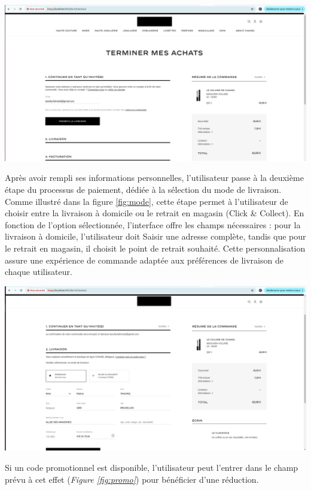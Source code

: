 \begin{center}
    \centering
    \includegraphics[width=19cm]{Figures/Screens/ajout de l'email.png}
    \label{fig:saisie}
\end{center}
Après avoir rempli ses informations personnelles, l'utilisateur passe à la deuxième étape du processus de paiement, dédiée à la sélection du mode de livraison. Comme illustré dans la figure \ref{fig:mode}, cette étape permet à l'utilisateur de choisir entre la livraison à domicile ou le retrait en magasin (Click \& Collect). 
En fonction de l'option sélectionnée, l'interface offre les champs nécessaires : pour la livraison à domicile, l'utilisateur doit Saisir une adresse complète, tandis que pour le retrait en magasin, il choisit le point de retrait souhaité. Cette personnalisation assure une expérience de commande adaptée aux préférences de livraison de chaque utilisateur.
\begin{center}
    \centering
    \includegraphics[width=19cm]{Figures/Screens/Infos livraison.png}
    \label{fig:mode}
\end{center}
Si un code promotionnel est disponible, l'utilisateur peut l'entrer dans le champ prévu à cet effet (\textit{Figure \ref{fig:promo}}) pour bénéficier d'une réduction. 
